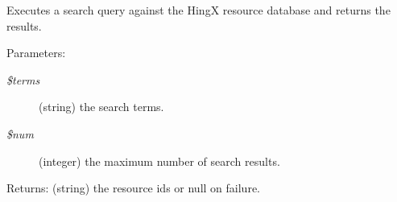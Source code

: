 Executes a search query against the Hing\-X resource database and returns the results. 

\begin{Desc}
\item[Parameters:]
\begin{description}
\item[{\em \$terms}](string) the search terms. \item[{\em \$num}](integer) the maximum number of search results. \end{description}
\end{Desc}
\begin{Desc}
\item[Returns:](string) the resource ids or null on failure. \end{Desc}
